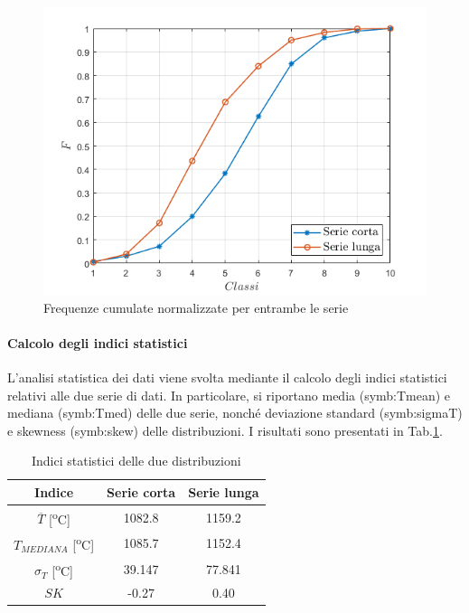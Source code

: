 \begin{figure}
	\centering
	\includegraphics[width=0.7\linewidth]{chapters/1-misureT/cumboth}
	\caption{Frequenze cumulate normalizzate per entrambe le serie}
	\label{fig:cumboth}
\end{figure}


\paragraph{Calcolo degli indici statistici}
L'analisi statistica dei dati viene svolta mediante il calcolo degli indici statistici relativi alle due serie di dati. In particolare, si riportano media (\gls{symb:Tmean}) e mediana (\gls{symb:Tmed}) delle due serie, nonché deviazione standard (\gls{symb:sigmaT}) e skewness (\gls{symb:skew}) delle distribuzioni. I risultati sono presentati in Tab.\ref{tab:indicistat}.

\begin{table} [H]
	\centering
	\begin{tabular}{c|c|c}
		\toprule
		\toprule
		\textbf{Indice} & \textbf{Serie corta}&\textbf{Serie lunga}\\
		\midrule
		\midrule
		$\overline{T}$ [\textsuperscript{o}C]& 1082.8 & 1159.2\\
		\midrule
		$T_\textit{MEDIANA}$ [\textsuperscript{o}C]&1085.7&1152.4\\
		\midrule
		$\sigma_T$ [\textsuperscript{o}C]&39.147 & 77.841\\
		\midrule
		$SK$ & -0.27 & 0.40 \\
		\bottomrule
		\bottomrule
	\end{tabular}
\caption{Indici statistici delle due distribuzioni}
\label{tab:indicistat}
\end{table}

